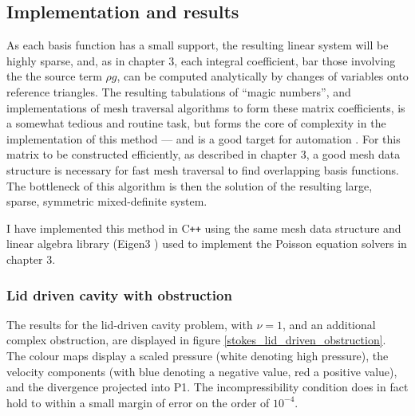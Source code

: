 \subsection{Implementation and results}
As each basis function has a small support, the resulting linear system will be highly sparse, and, as in chapter 3, each integral coefficient, bar
those involving the
the source term $\rho g$, can be computed analytically by changes of variables onto reference triangles. The resulting tabulations of ``magic numbers'',
and implementations of mesh traversal algorithms to form these matrix coefficients, is a somewhat tedious and routine task, but forms the core of complexity
in the implementation of this method --- and is a good target for automation \cite{automating_fem} \cite{fenics_book} \cite{firedrake}. For this matrix to be constructed efficiently, as described in chapter 3, a good mesh data structure is necessary
for fast mesh traversal to find overlapping basis functions. The bottleneck of this algorithm is then the solution of the resulting
large, sparse, symmetric mixed-definite system.

I have implemented this method in C\texttt{++} using the same mesh data structure and linear algebra library (Eigen3 \cite{eigen})
used to implement the Poisson equation solvers in chapter 3.

\subsubsection{Lid driven cavity with obstruction}
The results for the lid-driven cavity problem, with $\nu = 1$, and an additional complex obstruction, are displayed in figure
\ref{stokes_lid_driven_obstruction}. The colour maps display a scaled pressure (white denoting high pressure), the velocity components
(with blue denoting a negative value, red a positive value), and the divergence projected into P1. The incompressibility condition does in fact
hold to within a small margin of error on the order of $10^{-4}$.


